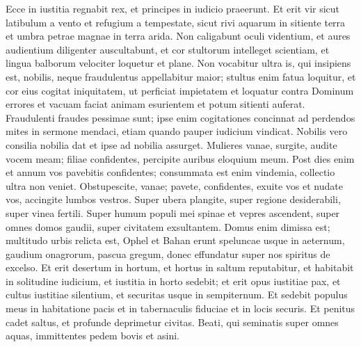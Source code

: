 \begin{biblechapter}  
\verse Ecce in iustitia regnabit rex, et principes in iudicio praeerunt. 
\verse Et erit vir sicut latibulum a vento et refugium a tempestate, sicut rivi aquarum in sitiente terra et umbra petrae magnae in terra arida. 
\verse Non caligabunt oculi videntium, et aures audientium diligenter auscultabunt, 
\verse et cor stultorum intelleget scientiam, et lingua balborum velociter loquetur et plane. 
\verse Non vocabitur ultra is, qui insipiens est, nobilis, neque fraudulentus appellabitur maior; 
\verse stultus enim fatua loquitur, et cor eius cogitat iniquitatem, ut perficiat impietatem et loquatur contra Dominum errores et vacuam faciat animam esurientem et potum sitienti auferat. 
\verse Fraudulenti fraudes pessimae sunt; ipse enim cogitationes concinnat ad perdendos mites in sermone mendaci, etiam quando pauper iudicium vindicat. 
\verse Nobilis vero consilia nobilia dat et ipse ad nobilia assurget. 
\verse Mulieres vanae, surgite, audite vocem meam; filiae confidentes, percipite auribus eloquium meum. 
\verse Post dies enim et annum vos pavebitis confidentes; consummata est enim vindemia, collectio ultra non veniet. 
\verse Obstupescite, vanae; pavete, confidentes, exuite vos et nudate vos, accingite lumbos vestros. 
\verse Super ubera plangite, super regione desiderabili, super vinea fertili. 
\verse Super humum populi mei spinae et vepres ascendent, super omnes domos gaudii, super civitatem exsultantem. 
\verse Domus enim dimissa est; multitudo urbis relicta est, Ophel et Bahan erunt speluncae usque in aeternum, gaudium onagrorum, pascua gregum, 
\verse donec effundatur super nos spiritus de excelso. Et erit desertum in hortum, et hortus in saltum reputabitur, 
\verse et habitabit in solitudine iudicium, et iustitia in horto sedebit; 
\verse et erit opus iustitiae pax, et cultus iustitiae silentium, et securitas usque in sempiternum. 
\verse Et sedebit populus meus in habitatione pacis et in tabernaculis fiduciae et in locis securis. 
\verse Et penitus cadet saltus, et profunde deprimetur civitas. 
\verse Beati, qui seminatis super omnes aquas, immittentes pedem bovis et asini. 
\end{biblechapter}

